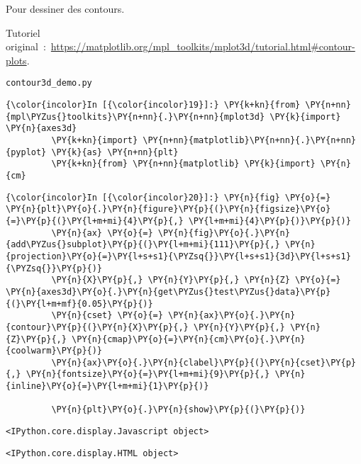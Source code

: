     Pour dessiner des contours.

    Tutoriel
original~:~\url{https://matplotlib.org/mpl_toolkits/mplot3d/tutorial.html\#contour-plots}.

    \texttt{contour3d\_demo.py}

    \begin{Verbatim}[commandchars=\\\{\},frame=single,framerule=0.3mm,rulecolor=\color{cellframecolor}]
{\color{incolor}In [{\color{incolor}19}]:} \PY{k+kn}{from} \PY{n+nn}{mpl\PYZus{}toolkits}\PY{n+nn}{.}\PY{n+nn}{mplot3d} \PY{k}{import} \PY{n}{axes3d}
         \PY{k+kn}{import} \PY{n+nn}{matplotlib}\PY{n+nn}{.}\PY{n+nn}{pyplot} \PY{k}{as} \PY{n+nn}{plt}
         \PY{k+kn}{from} \PY{n+nn}{matplotlib} \PY{k}{import} \PY{n}{cm}
\end{Verbatim}


    \begin{Verbatim}[commandchars=\\\{\},frame=single,framerule=0.3mm,rulecolor=\color{cellframecolor}]
{\color{incolor}In [{\color{incolor}20}]:} \PY{n}{fig} \PY{o}{=} \PY{n}{plt}\PY{o}{.}\PY{n}{figure}\PY{p}{(}\PY{n}{figsize}\PY{o}{=}\PY{p}{(}\PY{l+m+mi}{4}\PY{p}{,} \PY{l+m+mi}{4}\PY{p}{)}\PY{p}{)}
         \PY{n}{ax} \PY{o}{=} \PY{n}{fig}\PY{o}{.}\PY{n}{add\PYZus{}subplot}\PY{p}{(}\PY{l+m+mi}{111}\PY{p}{,} \PY{n}{projection}\PY{o}{=}\PY{l+s+s1}{\PYZsq{}}\PY{l+s+s1}{3d}\PY{l+s+s1}{\PYZsq{}}\PY{p}{)}
         \PY{n}{X}\PY{p}{,} \PY{n}{Y}\PY{p}{,} \PY{n}{Z} \PY{o}{=} \PY{n}{axes3d}\PY{o}{.}\PY{n}{get\PYZus{}test\PYZus{}data}\PY{p}{(}\PY{l+m+mf}{0.05}\PY{p}{)}
         \PY{n}{cset} \PY{o}{=} \PY{n}{ax}\PY{o}{.}\PY{n}{contour}\PY{p}{(}\PY{n}{X}\PY{p}{,} \PY{n}{Y}\PY{p}{,} \PY{n}{Z}\PY{p}{,} \PY{n}{cmap}\PY{o}{=}\PY{n}{cm}\PY{o}{.}\PY{n}{coolwarm}\PY{p}{)}
         \PY{n}{ax}\PY{o}{.}\PY{n}{clabel}\PY{p}{(}\PY{n}{cset}\PY{p}{,} \PY{n}{fontsize}\PY{o}{=}\PY{l+m+mi}{9}\PY{p}{,} \PY{n}{inline}\PY{o}{=}\PY{l+m+mi}{1}\PY{p}{)}
         
         \PY{n}{plt}\PY{o}{.}\PY{n}{show}\PY{p}{(}\PY{p}{)}
\end{Verbatim}


    
    \begin{verbatim}
<IPython.core.display.Javascript object>
    \end{verbatim}

    
    
    \begin{verbatim}
<IPython.core.display.HTML object>
    \end{verbatim}

